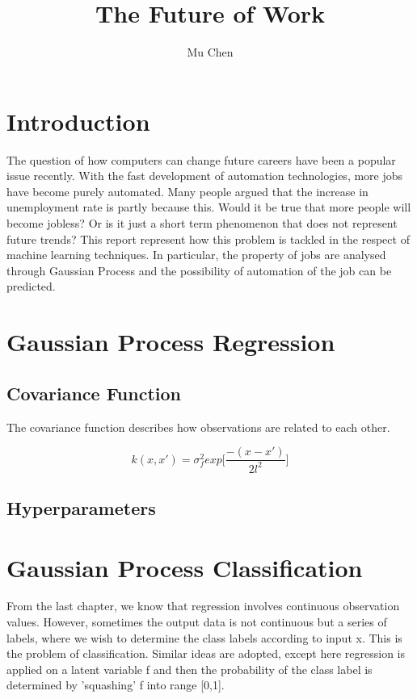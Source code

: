 \documentclass[11pt]{report}
\title{The Future of Work}
\author{Mu Chen}
\begin{document}

\section{Introduction}
The question of how computers can change future careers have been a popular issue recently. With the fast development of automation technologies, more jobs have become purely automated. Many people argued that the increase in unemployment rate is partly because this. Would it be true that more people will become jobless? Or is it just a short term phenomenon that does not represent future trends? This report represent how this problem is tackled in the respect of machine learning techniques. In particular, the property of jobs are analysed through Gaussian Process and the possibility of automation of the job can be predicted. 

\newpage
{}
\section{Gaussian Process Regression}

\subsection{Covariance Function}
The covariance function describes how observations are related to each other.

\[k(x,x\prime) = \sigma_f^2exp\big[\frac{-(x-x\prime)}{2l^2}\big]\]

\subsection{Hyperparameters}

\newpage
{}
\section{Gaussian Process Classification}
From the last chapter, we know that regression involves continuous observation values. However, sometimes the output data is not continuous but a series of labels, where we wish to determine the class labels according to input x. This is the problem of classification. Similar ideas are adopted, except here regression is applied on a latent variable f and then the probability of the class label is determined by 'squashing' f into range [0,1].
\end{document}
